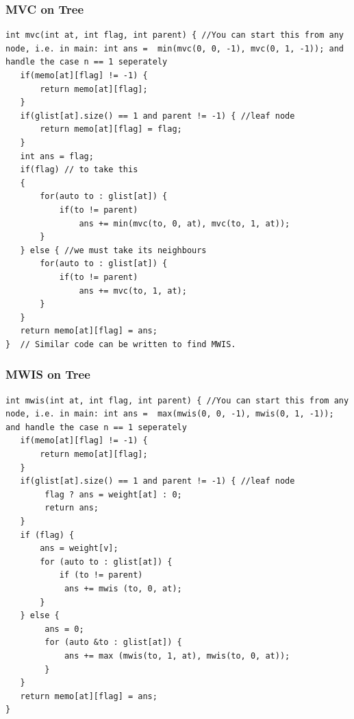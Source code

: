 \documentclass[8pt, a4paper, oneside, twocolumn]{extarticle}
\begin{document}
\subsubsection{MVC on Tree}
\begin{verbatim}
int mvc(int at, int flag, int parent) { //You can start this from any node, i.e. in main: int ans =  min(mvc(0, 0, -1), mvc(0, 1, -1)); and handle the case n == 1 seperately
   if(memo[at][flag] != -1) {
       return memo[at][flag];
   }
   if(glist[at].size() == 1 and parent != -1) { //leaf node
       return memo[at][flag] = flag;
   }
   int ans = flag;
   if(flag) // to take this
   {
       for(auto to : glist[at]) {
           if(to != parent)
               ans += min(mvc(to, 0, at), mvc(to, 1, at));
       }
   } else { //we must take its neighbours
       for(auto to : glist[at]) {
           if(to != parent)
               ans += mvc(to, 1, at);
       }
   }
   return memo[at][flag] = ans;
}  // Similar code can be written to find MWIS.
\end{verbatim}
\subsubsection{MWIS on Tree}
\begin{verbatim}
int mwis(int at, int flag, int parent) { //You can start this from any node, i.e. in main: int ans =  max(mwis(0, 0, -1), mwis(0, 1, -1)); and handle the case n == 1 seperately
   if(memo[at][flag] != -1) {
       return memo[at][flag];
   }
   if(glist[at].size() == 1 and parent != -1) { //leaf node
        flag ? ans = weight[at] : 0;
        return ans;
   }
   if (flag) {
       ans = weight[v];
       for (auto to : glist[at]) {
           if (to != parent)
            ans += mwis (to, 0, at);
       }
   } else {
        ans = 0;
        for (auto &to : glist[at]) {
            ans += max (mwis(to, 1, at), mwis(to, 0, at));
        }
   }
   return memo[at][flag] = ans;
}  
\end{verbatim}
\end{document}
